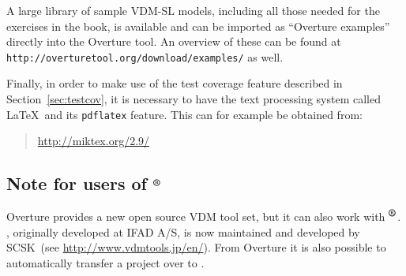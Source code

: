 A large library of sample VDM-SL models, including all those needed for the exercises in the book, is available and can be imported as ``Overture examples'' directly into the Overture tool.  An overview of these can be found at \texttt{http://overturetool.org/download/examples/} as well.

Finally, in order to make use of the test coverage feature described in Section~\ref{sec:testcov}, it is necessary to have the text processing system called \LaTeX\ and its \texttt{pdflatex} feature. This can for example be obtained from:
%
\begin{quote}
\url{http://miktex.org/2.9/}
\end{quote}
%
\subsection*{Note for users of \vdmtools$^{\mbox{\small\textbf{{\textregistered}}}}$}
Overture provides a new open source VDM tool set, but it can also work with \vdmtools$^{\mbox{\small\textbf{{\textregistered}}}}$. \vdmtools, originally developed at IFAD A/S, is now maintained and developed by SCSK~(see \url{http://www.vdmtools.jp/en/}). From Overture it is also possible to automatically transfer a project over to \vdmtools.
%
